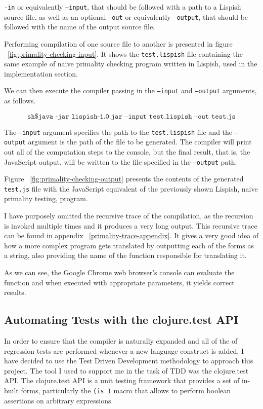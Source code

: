 \texttt{-in} or equivalently \texttt{--input}, that should be followed with a path to a Lispish source file, as well as an optional 
\texttt{-out} or equivalently \texttt{--output}, that should be followed with the name of the output source file. 

Performing compilation of one source file to another is presented in figure ~\ref{fig:primality-checking-input}. It shows the \texttt{test.lispish} file containing the same example of naive primality checking program written in Lispish, used in the implementation section. 

We can then execute the compiler passing in the \texttt{--input} and \texttt{--output} arguments, as follows.

$$ \texttt{sh\$ java -jar lispish-1.0.jar --input test.lispish --out test.js} $$

The \texttt{--input} argument specifies the path to the \texttt{test.lispish} file and the \texttt{--output} argument is the path of the file to be generated.
The compiler will print out all of the computation steps to the console, but the final result, that is, the JavaScript output, will be written to the file specified in the \texttt{--output} path.

Figure ~\ref{fig:primality-checking-output} presents the contents of the generated \texttt{test.js} file with the JavaScript equivalent of the previously shown Lispish, naive primality testing, program. 

I have purposely omitted the recursive trace of the compilation, as the recursion is invoked multiple times and it produces a very long output. 
This recursive trace can be found in appendix ~\ref{primality-trace-appendix}. It gives a very good idea of how a more complex program gets translated by outputting each of the forms as a string, also providing the name of the function responsible for translating it. 

As we can see, the Google Chrome web browser's console can evaluate the function and when executed with appropriate parameters, it yields correct results. 

\subsection{Automating Tests with the clojure.test API}
In order to ensure that the compiler is naturally expanded and all of the of regression tests are performed whenever a new language construct is added, I have decided to use the Test Driven Development methodology to approach this project. 
The tool I used to support me in the task of TDD was the clojure.test API.
The clojure.test API\cite{clojure.test:2011:Site} is a unit testing framework that provides a set of in-built forms, particularly the \texttt{(is )} macro that allows to perform boolean assertions on arbitrary expressions. 

